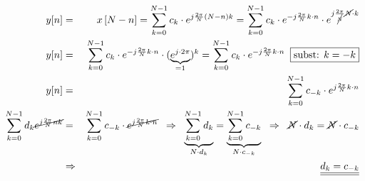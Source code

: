 \begin{uebsp}
\begin{Answer}
\begin{enumerate}[a)]
        \begin{eqnarray*}
            y[n]&=&x\left[N-n\right]=\sum_{k=0}^{N-1}c_k\cdot e^{j\frac{2\pi}{N}\left(N-n\right)k}=
            \sum_{k=0}^{N-1}c_k\cdot e^{-j\frac{2\pi}{N}k\cdot n}\cdot e^{j\frac{2\pi}{\cancel N}\cancel N\cdot k}\\
            y[n]&=&\sum_{k=0}^{N-1}c_k\cdot e^{-j\frac{2\pi}{N}k\cdot n}\cdot (\underbrace{e^{j\cdot 2\pi}}_{=1})^k=\sum_{k=0}^{N-1}c_k\cdot e^{-j\frac{2\pi}{N}k\cdot n}\;\;\fbox{subst: $k=-k$}\\
            y[n]&=&\sum_{k=0}^{N-1}c_{-k}\cdot e^{j\frac{2\pi}{N}k\cdot n}\\
            \sum_{k=0}^{N-1}d_k\cancel{e^{j\frac{2\pi}{N}nk}}&=&\sum_{k=0}^{N-1}c_{-k}\cdot \cancel{e^{j\frac{2\pi}{N}k\cdot n}}\;\;\Rightarrow\;\;
            \underbrace{\sum_{k=0}^{N-1}d_{k}}_{N\cdot d_{k}}=\underbrace{\sum_{k=0}^{N-1}c_{-k}}_{N\cdot c_{-k}}\;\;\Rightarrow\;\;
            \cancel N\cdot d_k=\cancel N\cdot c_{-k}\\
            &\Rightarrow& \underline{\underline{d_k=c_{-k}}}


\end{eqnarray*}
\end{enumerate}
\end{Answer}
\end{uebsp}
